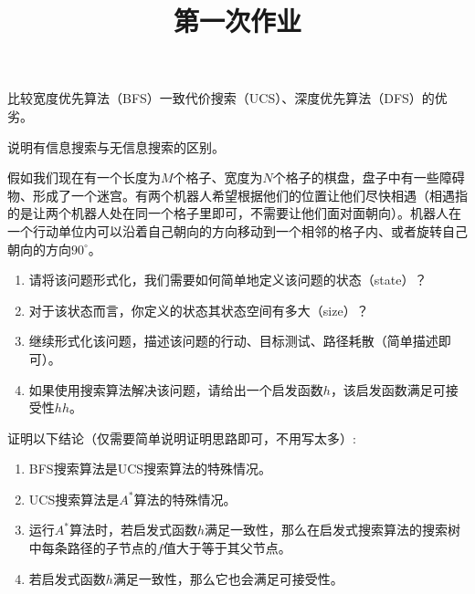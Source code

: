 

    \title{第一次作业}
    \maketitle

    \begin{problem}
        比较宽度优先算法（BFS）一致代价搜索（UCS）、深度优先算法（DFS）的优劣。
    \end{problem}

    \begin{problem}
        说明有信息搜索与无信息搜索的区别。
    \end{problem}

    \begin{problem}
        假如我们现在有一个长度为$M$个格子、宽度为$N$个格子的棋盘，盘子中有一些障碍物、形成了一个迷宫。有两个机器人希望根据他们的位置让他们尽快相遇（相遇指的是让两个机器人处在同一个格子里即可，不需要让他们面对面朝向）。机器人在一个行动单位内可以沿着自己朝向的方向移动到一个相邻的格子内、或者旋转自己朝向的方向$90^{\circ}$。
        \begin{enumerate}
            \item 请将该问题形式化，我们需要如何简单地定义该问题的状态（state）？
            \item 对于该状态而言，你定义的状态其状态空间有多大（size）？
            \item 继续形式化该问题，描述该问题的行动、目标测试、路径耗散（简单描述即可）。
            \item 如果使用搜索算法解决该问题，请给出一个启发函数$h$，该启发函数满足可接受性$hh$。
        \end{enumerate}
    \end{problem}

    \begin{problem}
        证明以下结论（仅需要简单说明证明思路即可，不用写太多）:
        \begin{enumerate}
            \item BFS搜索算法是UCS搜索算法的特殊情况。
            \item UCS搜索算法是$A^{\ast}$算法的特殊情况。
            \item 运行$A^{\ast}$算法时，若启发式函数$h$满足一致性，那么在启发式搜索算法的搜索树中每条路径的子节点的$f$值大于等于其父节点。
            \item 若启发式函数$h$满足一致性，那么它也会满足可接受性。
        \end{enumerate}
    \end{problem}
